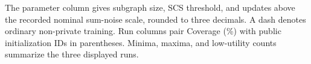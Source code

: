 \begin{table}[htbp]
\begin{tabular}{lllrrrrrr}
\bottomrule\end{tabular}
\par\vspace{3pt}\begin{minipage}{.97\textwidth}\footnotesize The parameter column gives subgraph size, SCS threshold, and updates above the recorded nominal sum-noise scale, rounded to three decimals. A dash denotes ordinary non-private training. Run columns pair Coverage (\%) with public initialization IDs in parentheses. Minima, maxima, and low-utility counts summarize the three displayed runs.\end{minipage}
\end{table}
